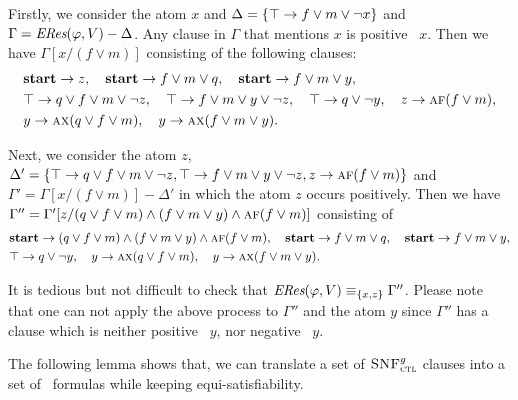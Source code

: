 \documentclass[twoside,11pt]{article}
\begin{document}
\begin{example}\label{examp:Aclm}
   Firstly, we consider the atom $x$ and $\Delta=\{\top \rightarrow f \vee m \vee \neg x\}$ and $\Gamma=\emph{ERes}(\varphi,V)-\Delta$.
   Any clause in $\Gamma$ that mentions $x$ is positive \wrt\ $x$. Then we have $\Gamma[x/(f \vee m)]$ consisting of the following clauses:
	\begin{align*}%
		& \start\rto z, \quad \start \rto f\vee m \vee q, \quad  \start \rto f \vee m \vee y, \\
		& \top \rto q \vee f \vee m \vee \neg z, \quad 	\top \rto f \vee m \vee y \vee \neg z,
        \quad \top \rto q\vee\neg y , \quad z \rto \ALL \FUTURE (f \vee m), \\
		& y \rto \ALL\NEXT(q \vee f\vee m), %
        \quad 	y \rto \ALL\NEXT(f\vee m\vee y).
	\end{align*}

    Next, we consider the atom $z$,
    $\Delta'=\{ \top \rightarrow q \vee f \vee m \vee \neg z, \top \rightarrow f \vee m \vee y \vee \neg z ,z \rightarrow \textsc{a} \textsc{f} (f \vee m)\}$
    and $\Gamma'=\Gamma[x/(f \vee m)] -\Delta'$ in which the atom $z$ occurs positively. Then we have
    $\Gamma''=\Gamma'[z/ (q \vee f \vee m)\land (f \vee m \vee y)\land\textsc{a} \textsc{f} (f \vee m)]$ consisting of
 	\begin{align*}%
		& \start\rto  (q \vee f \vee m)\land (f \vee m \vee y)\land\ALL \FUTURE (f \vee m),
        \quad \start \rto f\vee m \vee q, \quad  \start \rto f \vee m \vee y,  \\
        &  \top \rto q\vee\neg y,  \quad y \rto \ALL\NEXT(q \vee f\vee m), \quad y \rto \ALL\NEXT(f\vee m\vee y).
	\end{align*}

    It is tedious but not difficult to check that $\emph{ERes}(\varphi,V)\equiv_{\{x,z\}} \Gamma''$.
    Please note that one can not apply the above process to $\Gamma''$ and the atom $y$ since $\Gamma''$  has a clause
    which is neither positive \wrt\ $y$, nor negative \wrt\ $y$.
\end{example}
 

The following lemma shows that, we can translate a set of ${\textsc{SNF}_{\textsc{ctl}}^g}$ clauses into a set of \CTL\ formulas while keeping equi-satisfiability.
\end{document}
